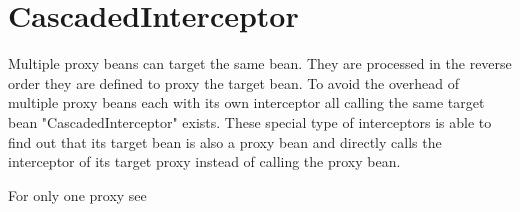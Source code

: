 \section{CascadedInterceptor}
\label{feature:CascadedInterceptor}
\ClearAPI
Multiple proxy beans can target the same bean. They are processed in the reverse order they are defined to proxy the target bean. To avoid the overhead of multiple proxy beans each with its own interceptor all calling the same target bean "CascadedInterceptor" exists. These special type of interceptors is able to find out that its target bean is also a proxy bean and directly calls the interceptor of its target proxy instead of calling the proxy bean.

\def\showimgref{img/proxybeans2.png}

For only one proxy see 
